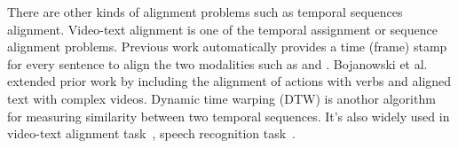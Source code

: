 There are other kinds of alignment problems such as temporal sequences alignment. Video-text alignment is one of the temporal assignment or sequence alignment problems. Previous work automatically provides a time (frame) stamp for every sentence to align the two modalities such as \cite{bojanowski2015weakly} and \cite{dogan2018neural}. Bojanowski et al.~ extended prior work by including the alignment of actions with verbs and aligned text with complex videos. Dynamic time warping (DTW) is anothor algorithm for measuring similarity between two temporal sequences. It's also widely used in video-text alignment task~\cite{dogan2018neural}, speech recognition task~\cite{vintsyuk1968speech}.%





